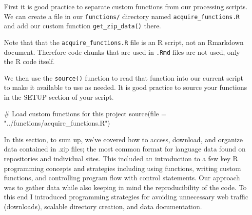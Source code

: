 \documentclass[
  letterpaper,
]{latex/krantz}
\newenvironment{Shaded}{\begin{snugshade}}{\end{snugshade}}
\newcommand{\AttributeTok}[1]{\textcolor[rgb]{0.40,0.45,0.13}{#1}}
\newcommand{\CommentTok}[1]{\textcolor[rgb]{0.37,0.37,0.37}{#1}}
\newcommand{\FunctionTok}[1]{\textcolor[rgb]{0.28,0.35,0.67}{#1}}
\newcommand{\NormalTok}[1]{\textcolor[rgb]{0.00,0.23,0.31}{#1}}
\newcommand{\StringTok}[1]{\textcolor[rgb]{0.13,0.47,0.30}{#1}}
\begin{document}
First it is good practice to separate custom functions from our
processing scripts. We can create a file in our \texttt{functions/}
directory named \texttt{acquire\_functions.R} and add our custom
function \texttt{get\_zip\_data()} there.

\begin{tcolorbox}[enhanced jigsaw, toprule=.15mm, bottomtitle=1mm, coltitle=black, title=\textcolor{quarto-callout-warning-color}{\faExclamationTriangle}\hspace{0.5em}{Tip}, left=2mm, colframe=quarto-callout-warning-color-frame, bottomrule=.15mm, colbacktitle=quarto-callout-warning-color!10!white, leftrule=.75mm, colback=white, titlerule=0mm, breakable, toptitle=1mm, opacityback=0, arc=.35mm, rightrule=.15mm, opacitybacktitle=0.6]

Note that that the \texttt{acquire\_functions.R} file is an R script,
not an Rmarkdown document. Therefore code chunks that are used in
\texttt{.Rmd} files are not used, only the R code itself.

\end{tcolorbox}

We then use the \texttt{source()} function to read that function into
our current script to make it available to use as needed. It is good
practice to source your functions in the SETUP section of your script.

\begin{Shaded}
\begin{Highlighting}[]
\CommentTok{\# Load custom functions for this project}
\FunctionTok{source}\NormalTok{(}\AttributeTok{file =} \StringTok{"../functions/acquire\_functions.R"}\NormalTok{)}
\end{Highlighting}
\end{Shaded}

In this section, to sum up, we've covered how to access, download, and
organize data contained in .zip files; the most common format for
language data found on repositories and individual sites. This included
an introduction to a few key R programming concepts and strategies
including using functions, writing custom functions, and controlling
program flow with control statements. Our approach was to gather data
while also keeping in mind the reproducibility of the code. To this end
I introduced programming strategies for avoiding unnecessary web traffic
(downloads), scalable directory creation, and data documentation.
\end{document}
